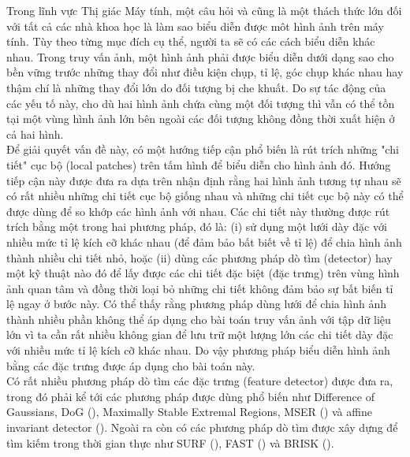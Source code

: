 Trong lĩnh vực Thị giác Máy tính, một câu hỏi và cũng là một thách thức lớn đối với tất cả các nhà khoa học là làm sao biểu diễn được môt hình ảnh trên máy tính. Tùy theo từng mục đích cụ thể, người ta sẽ có các cách biểu diễn khác nhau. Trong truy vấn ảnh, một hình ảnh phải được biểu diễn dưới dạng sao cho bền vững trước những thay đổi như điều kiện chụp, tỉ lệ, góc chụp khác nhau hay thậm chí là những thay đổi lớn do đối tượng bị che khuất. Do sự tác động của các yếu tố này, cho dù hai hình ảnh chứa cùng một đối tượng thì vẫn có thể tồn tại một vùng hình ảnh lớn bên ngoài các đối tượng không đồng thời xuất hiện ở cả hai hình.\\
Để giải quyết vấn đề này, có một hướng tiếp cận phổ biến là rút trích những "chi tiết" cục bộ (local patches) trên tấm hình để biểu diễn cho hình ảnh đó. Hướng tiếp cận này được đưa ra dựa trên nhận định rằng hai hình ảnh tương tự nhau sẽ có rất nhiều những chi tiết cục bộ giống nhau và những chi tiết cục bộ này có thể được dùng để so khớp các hình ảnh với nhau. Các chi tiết này thường được rút trích bằng một trong hai phương pháp, đó là: (i) sử dụng một lưới dày đặc với nhiều mức tỉ lệ kích cỡ khác nhau (để đảm bảo bất biết về tỉ lệ) để chia hình ảnh thành nhiều chi tiết nhỏ, hoặc (ii) dùng các phương pháp dò tìm (detector) hay một kỹ thuật nào đó để lấy được các chi tiết đặc biệt (đặc trưng) trên vùng hình ảnh quan tâm và đồng thời loại bỏ những chi tiết không đảm bảo sự bất biến tỉ lệ ngay ở bước này. Có thể thấy rằng phương pháp dùng lưới để chia hình ảnh thành nhiều phần không thể áp dụng cho bài toán truy vấn ảnh với tập dữ liệu lớn vì ta cần rất nhiều không gian để lưu trữ một lượng lớn các chi tiết dày đặc với nhiều mức tỉ lệ kích cỡ khác nhau. Do vậy phương pháp biểu diễn hình ảnh bằng các đặc trưng được áp dụng cho bài toán này.\\
Có rất nhiều phương pháp dò tìm các đặc trưng (feature detector) được đưa ra, trong đó phải kể tới các phương pháp được dùng phổ biến như Difference of Gaussians, DoG (\cite{lowe2004distinctive}), Maximally Stable Extremal Regions, MSER (\cite{matas2004robust}) và affine invariant detector (\cite{mikolajczyk2004scale}). Ngoài ra còn có các phương pháp dò tìm được xây dựng để tìm kiếm trong thời gian thực như SURF (\cite{bay2006surf}), FAST (\cite{rosten2010faster}) và BRISK (\cite{leutenegger2011brisk}).\\
